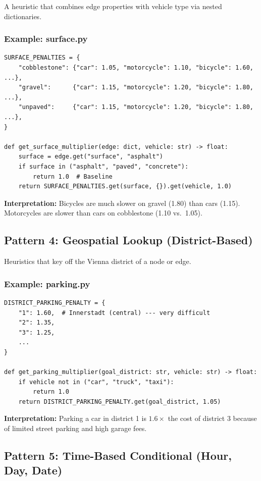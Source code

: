 \documentclass[12pt,a4paper]{article}
\begin{document}
A heuristic that combines edge properties with vehicle type via nested dictionaries.

\subsubsection{Example: surface.py}

\begin{lstlisting}
SURFACE_PENALTIES = {
    "cobblestone": {"car": 1.05, "motorcycle": 1.10, "bicycle": 1.60, ...},
    "gravel":      {"car": 1.15, "motorcycle": 1.20, "bicycle": 1.80, ...},
    "unpaved":     {"car": 1.15, "motorcycle": 1.20, "bicycle": 1.80, ...},
}

def get_surface_multiplier(edge: dict, vehicle: str) -> float:
    surface = edge.get("surface", "asphalt")
    if surface in ("asphalt", "paved", "concrete"):
        return 1.0  # Baseline
    return SURFACE_PENALTIES.get(surface, {}).get(vehicle, 1.0)
\end{lstlisting}

\textbf{Interpretation:} Bicycles are much slower on gravel (1.80) than cars (1.15). Motorcycles are slower than cars on cobblestone (1.10 vs.\ 1.05).

\subsection{Pattern 4: Geospatial Lookup (District-Based)}

Heuristics that key off the Vienna district of a node or edge.

\subsubsection{Example: parking.py}

\begin{lstlisting}
DISTRICT_PARKING_PENALTY = {
    "1": 1.60,  # Innerstadt (central) --- very difficult
    "2": 1.35,
    "3": 1.25,
    ...
}

def get_parking_multiplier(goal_district: str, vehicle: str) -> float:
    if vehicle not in ("car", "truck", "taxi"):
        return 1.0
    return DISTRICT_PARKING_PENALTY.get(goal_district, 1.05)
\end{lstlisting}

\textbf{Interpretation:} Parking a car in district 1 is $1.6\times$ the cost of district 3 because of limited street parking and high garage fees.

\subsection{Pattern 5: Time-Based Conditional (Hour, Day, Date)}
\end{document}
